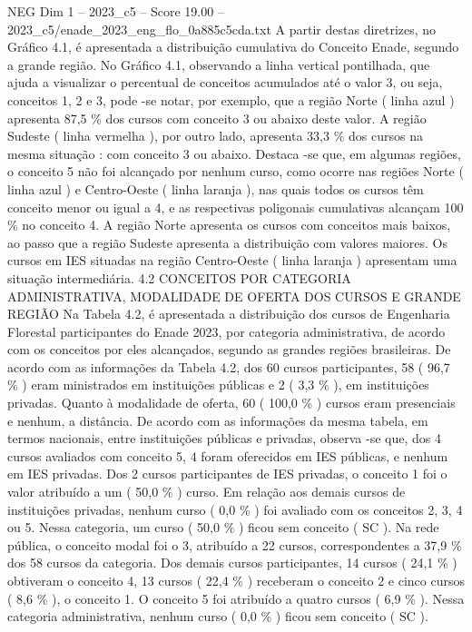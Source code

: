 \begin{textsample}{NEG Dim 1 – 2023\_c5 – Score 19.00 – 2023\_c5/enade\_2023\_eng\_flo\_0a885c5cda.txt}
A partir destas diretrizes, no Gráfico 4.1, é apresentada a distribuição cumulativa do Conceito Enade, segundo a grande região.
No Gráfico 4.1, observando a linha vertical pontilhada, que ajuda a visualizar o percentual de conceitos acumulados até o valor 3, ou seja, conceitos 1, 2 e 3, pode -se notar, por exemplo, que a região Norte ( linha azul ) apresenta 87,5 \% dos cursos com conceito 3 ou abaixo deste valor.
A região Sudeste ( linha vermelha ), por outro lado, apresenta 33,3 \% dos cursos na mesma situação : com conceito 3 ou abaixo.
Destaca -se que, em algumas regiões, o conceito 5 não foi alcançado por nenhum curso, como ocorre nas regiões Norte ( linha azul ) e Centro-Oeste ( linha laranja ), nas quais todos os cursos têm conceito menor ou igual a 4, e as respectivas poligonais cumulativas alcançam 100 \% no conceito 4.
A região Norte apresenta os cursos com conceitos mais baixos, ao passo que a região Sudeste apresenta a distribuição com valores maiores.
Os cursos em IES situadas na região Centro-Oeste ( linha laranja ) apresentam uma situação intermediária. 4.2 CONCEITOS POR CATEGORIA ADMINISTRATIVA, MODALIDADE DE OFERTA DOS CURSOS E GRANDE REGIÃO Na Tabela 4.2, é apresentada a distribuição dos cursos de Engenharia Florestal participantes do Enade 2023, por categoria administrativa, de acordo com os conceitos por eles alcançados, segundo as grandes regiões brasileiras.
De acordo com as informações da Tabela 4.2, dos 60 cursos participantes, 58 ( 96,7 \% ) eram ministrados em instituições públicas e 2 ( 3,3 \% ), em instituições privadas.
Quanto à modalidade de oferta, 60 ( 100,0 \% ) cursos eram presenciais e nenhum, a distância.
De acordo com as informações da mesma tabela, em termos nacionais, entre instituições públicas e privadas, observa -se que, dos 4 cursos avaliados com conceito 5, 4 foram oferecidos em IES públicas, e nenhum em IES privadas.
Dos 2 cursos participantes de IES privadas, o conceito 1 foi o valor atribuído a um ( 50,0 \% ) curso.
Em relação aos demais cursos de instituições privadas, nenhum curso ( 0,0 \% ) foi avaliado com os conceitos 2, 3, 4 ou 5.
Nessa categoria, um curso ( 50,0 \% ) ficou sem conceito ( SC ).
Na rede pública, o conceito modal foi o 3, atribuído a 22 cursos, correspondentes a 37,9 \% dos 58 cursos da categoria.
Dos demais cursos participantes, 14 cursos ( 24,1 \% ) obtiveram o conceito 4, 13 cursos ( 22,4 \% ) receberam o conceito 2 e cinco cursos ( 8,6 \% ), o conceito 1.
O conceito 5 foi atribuído a quatro cursos ( 6,9 \% ).
Nessa categoria administrativa, nenhum curso ( 0,0 \% ) ficou sem conceito ( SC ).

\end{textsample}
